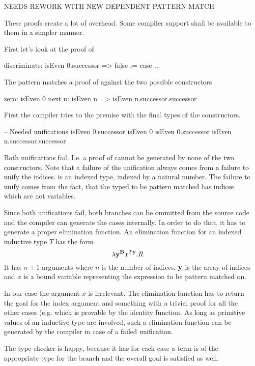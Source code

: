 \noindent NEEDS REWORK WITH NEW DEPENDENT PATTERN MATCH

These proofs create a lot of overhead. Some compiler support shall be available
to them in a simpler manner.

First let's look at the proof of
\begin{alba}
    discriminate: isEven 0.successor => false :=
        case ...
\end{alba}
The pattern matches a proof of  against the two
possible constructors
\begin{alba}
    zero: isEven 0
    next n: isEven n => isEven n.successor.successor
\end{alba}
First the compiler tries to the premise with the final types of the
constructors.
\begin{alba}
    -- Needed unifications
    isEven 0.successor              isEven 0
    isEven 0.successor              isEven n.successor.successor
\end{alba}
Both unifications fail. I.e. a proof of  cannot be
generated by none of the two constructors. Note that a failure of the
unification always comes from a failure to unify the indices.  is
an indexed type, indexed by a natural number. The failure to unify comes from
the fact, that the typed to be pattern matched has indices which are not
variables.

Since both unifications fail, both branches can be ommitted from the source code
and the compiler can generate the cases internally. In order to do that, it has
to generate a proper elimination function. An elimination function for an
indexed inductive type $T$ has the form
$$
    \lambda \mathbf{y}^{\mathbf{B}} x^{T \mathbf{y}}. R
$$
It has $n + 1$ arguments where $n$ is the number of indices. $\mathbf{y}$ is the
array of indices and $x$ is a bound variable representing the expression to be
pattern matched on.

In our case the argument $x$ is irrelevant. The elimination function has to
return the goal  for the index argument  and
something with a trivial proof for all the other cases (e.g. 
which is provable by the identity function. As long as primitive values of an
inductive type are involved, such a elimination function can be generated by the
compiler in case of a failed unification.

The type checker is happy, because it has for each case a term is of the
appropriate type for the branch and the overall goal is satisfied as well.

